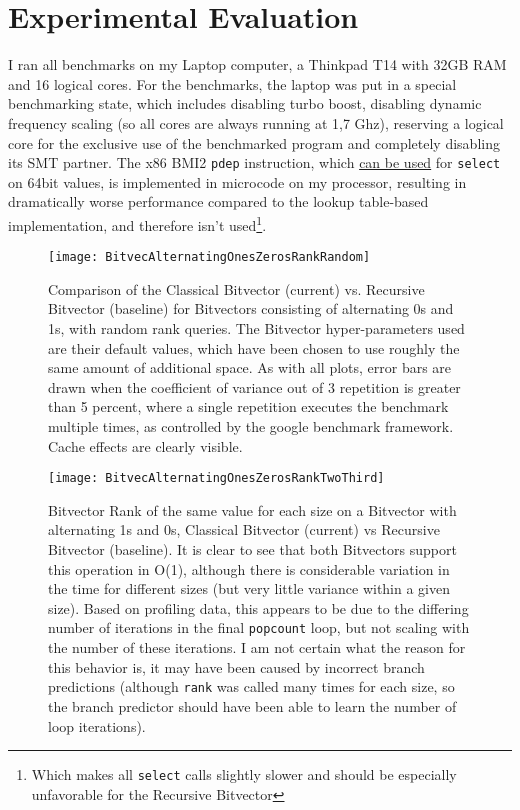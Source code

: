 \documentclass[a4paper,UKenglish,cleveref, autoref, thm-restate]{lipics-v2021}
\newcommand{\rank} {\texttt{rank}}
\newcommand{\select} {\texttt{select}}
\begin{document}
\section{Experimental Evaluation}
\label{ch:Conclusion}
I ran all benchmarks on my Laptop computer, a Thinkpad T14 with 32GB RAM and 16 logical cores.
For the benchmarks, the laptop was put in a special benchmarking state, which includes disabling turbo boost,
disabling dynamic frequency scaling (so all cores are always running at 1,7 Ghz), reserving a logical core for the exclusive use
of the benchmarked program and completely disabling its SMT partner.
The x86 BMI2 \texttt{pdep} instruction, which \href{https://stackoverflow.com/questions/7669057/find-nth-set-bit-in-an-int/27453505#27453505}{can be used} for \select{} on 64bit values, is implemented in microcode on my processor, resulting in dramatically worse performance compared to the lookup table-based implementation, and therefore isn't used\footnote{Which makes all \select{} calls slightly slower
and should be especially unfavorable for the Recursive Bitvector}.

\begin{figure}[h]
\caption{Comparison of the Classical Bitvector (current) vs. Recursive Bitvector (baseline) for Bitvectors consisting of alternating 0s and 1s,
with random rank queries.
The Bitvector hyper-parameters used are their default values, which have been chosen to use roughly the same amount of additional space.
As with all plots, error bars are drawn when the coefficient of variance out of 3 repetition is greater than 5 percent,
where a single repetition executes the benchmark multiple times, as controlled by the google benchmark framework.
Cache effects are clearly visible.}
\centering
\texttt{[image: BitvecAlternatingOnesZerosRankRandom]}
\label{fig:BitvecSelectRandom}
\end{figure}

\begin{figure}[h]
\caption{Bitvector Rank of the same value for each size on a Bitvector with alternating 1s and 0s, Classical Bitvector (current) vs Recursive Bitvector (baseline). It is clear to see that both Bitvectors support this operation in O(1), although there is considerable variation in the time for different sizes (but very little variance within a given size). Based on profiling data, this appears to be due to the differing number
of iterations in the final \texttt{popcount} loop, but not scaling with the number of these iterations. I am not certain what the reason for this
behavior is, it may have been caused by incorrect branch predictions (although \rank{} was called many times
for each size, so the branch predictor should have been able to learn the number of loop iterations). }
\centering
\texttt{[image: BitvecAlternatingOnesZerosRankTwoThird]}
\label{fig:rankConstant}
\end{figure}
\end{document}
